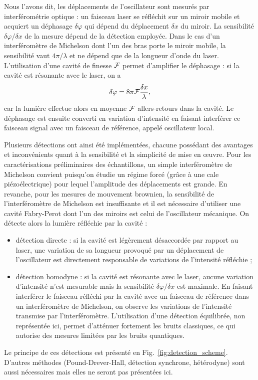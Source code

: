 \documentclass[12pt,a4paper]{article}
\begin{document}
Nous l'avons dit, les déplacements de l'oscillateur sont mesurés par interférométrie optique : un faisceau laser se réfléchit sur un miroir mobile et acquiert un déphasage $\delta\varphi$ qui dépend du déplacement $\delta x$ du miroir.
La sensibilité $\delta\varphi / \delta x$ de la mesure dépend de la détection employée.
Dans le cas d'un interféromètre de Michelson dont l'un des bras porte le miroir mobile, la sensibilité vaut $4\pi/\lambda$ et ne dépend que de la longueur d'onde du laser.
L'utilisation d'une cavité de finesse $\cal{F}$ permet d'amplifier le déphasage : si la cavité est résonante avec le laser, on a
\begin{equation}
\delta \varphi = 8\pi{\cal{F}}\frac{\delta x}{\lambda},
\end{equation}
car la lumière effectue alors en moyenne ${\cal{F}}$ allers-retours dans la cavité.
Le déphasage est ensuite converti en variation d'intensité en faisant interférer ce faisceau signal avec un faisceau de référence, appelé oscillateur local.

Plusieurs détections ont ainsi été implémentées, chacune possédant des avantages et inconvénients quant à la sensibilité et la simplicité de mise en œuvre.
Pour les caractérisations préliminaires des échantillons, un simple interféromètre de Michelson convient puisqu'on étudie un régime forcé (grâce à une cale piézoélectrique) pour lequel l'amplitude des déplacements est grande.
En revanche, pour les mesures de mouvement brownien, la sensibilité de l'interféromètre de Michelson est insuffisante et il est nécessaire d'utiliser une cavité Fabry-Perot dont l'un des miroirs est celui de l'oscillateur mécanique.
On détecte alors la lumière réfléchie par la cavité :
\begin{itemize}
\item détection directe : si la cavité est légèrement désaccordée par rapport au laser, une variation de sa longueur provoqué par un déplacement de l'oscillateur est directement responsable de variations de l'intensité réfléchie ;
\item détection homodyne : si la cavité est résonante avec le laser, aucune variation d'intensité n'est mesurable mais la sensibilité $\delta\varphi/\delta x$ est maximale.
En faisant interférer le faisceau réfléchi par la cavité avec un faisceau de référence dans un interféromètre de Michelson, on observe les variations de l'intensité transmise par l'interféromètre.
L'utilisation d'une détection équilibrée, non représentée ici, permet d'atténuer fortement les bruits classiques, ce qui autorise des mesures limitées par les bruits quantiques. 
\end{itemize}
Le principe de ces détections est présenté en Fig.~\ref{fig:detection_scheme}.
D'autres méthodes (Pound-Drever-Hall, détection synchrone, hétérodyne) sont aussi nécessaires mais elles ne seront pas présentées ici.
\end{document}
